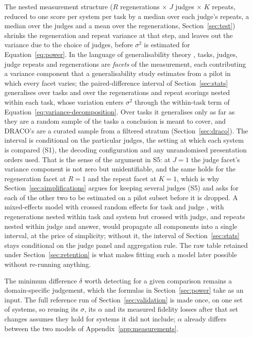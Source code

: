 \documentclass[11pt]{article}
\begin{document}
The nested measurement structure ($R$ regenerations $\times$ $J$ judges $\times$ $K$
repeats, reduced to one score per system per task by a median over each judge's repeats, a median over the judges and a mean over the regenerations, Section~\ref{sec:test}) shrinks the regeneration and repeat variance at that step, and leaves out the variance due to the choice of judges, before $\sigma^2$ is estimated for Equation~\ref{eq:power}. In the
language of generalisability theory \citep{brennan2001}, tasks, judges, judge repeats and
regenerations are \emph{facets} of the measurement, each contributing a variance component
that a generalisability study estimates from a pilot in which every facet varies; the paired-difference
interval of Section~\ref{sec:stats} generalises over tasks and over the regenerations and repeat scorings nested within each task, whose variation enters $\sigma^2$ through the within-task term of Equation~\ref{eq:variance-decomposition}. Over tasks it generalises only as far as they are a random sample of the tasks a conclusion is meant to cover, and DRACO's are a curated sample from a filtered stratum (Section~\ref{sec:draco}). The interval is
conditional on the particular judges, the setting at which each system is compared (S1), the decoding configuration and any unrandomised presentation orders
used. That is the sense of the argument in S5: at $J = 1$ the judge facet's
variance component is not zero but unidentifiable, and the same holds for the
regeneration facet at $R = 1$ and the repeat facet at $K = 1$, which is why
Section~\ref{sec:simplifications} argues for keeping several judges (S5) and asks for each of the other two to be estimated on a pilot subset before
it is dropped. A mixed-effects model with crossed random effects for task and judge
\citep{baayen2008}, with regenerations nested within task and system but crossed with judge, and repeats nested within judge and answer, would propagate all
components into a single interval, at the price of simplicity; without it, the interval of Section~\ref{sec:stats} stays conditional on the judge
panel and aggregation rule. The raw table retained under Section~\ref{sec:retention} is what
makes fitting such a model later possible without re-running anything.

The minimum difference $\delta$ worth detecting for a given comparison remains a domain-specific judgement, which the formulas in Section~\ref{sec:power} take as an input. The full reference run of Section~\ref{sec:validation} is made once, on one set of systems, so reusing its $\sigma$, its $\alpha$ and its measured fidelity losses after that set changes assumes they hold for systems it did not include; $\alpha$ already differs between the two models of Appendix~\ref{app:measurements}.
\end{document}
